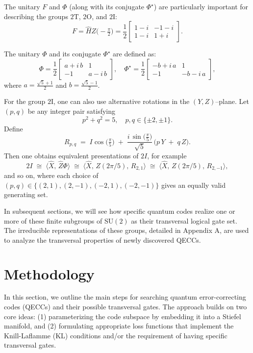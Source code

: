 \documentclass[8pt]{article}
\theoremstyle{definition}
\begin{document}
The unitary \(F\) and \(\Phi\) (along with its conjugate \(\Phi^\star\)) are particularly important for describing the groups \(2\mathrm{T}\), \(2\mathrm{O}\), and \(2\mathrm{I}\):
\[
    F = \hat{H}Z\bigl(-\tfrac{\pi}{2}\bigr) = \frac{1}{2}
    \begin{bmatrix}
        1 - i & -1 - i \\
        1 - i & 1 + i
    \end{bmatrix}.
\]

The unitary \(\Phi\) and its conjugate \(\Phi^\star\) are defined as:
\[
    \Phi = \frac{1}{2}
    \begin{bmatrix}
        a + i\,b & 1        \\
        -1       & a - i\,b
    \end{bmatrix}, \quad
    \Phi^\star = \frac{1}{2}
    \begin{bmatrix}
        -b + i\,a & 1         \\
        -1        & -b - i\,a
    \end{bmatrix},
\]
where \(a = \frac{\sqrt{5} + 1}{2}\) and \(b = \frac{\sqrt{5} - 1}{2}\).

For the group \(2\mathrm{I}\), one can also use alternative rotations in the \((Y,Z)\)–plane.  Let \((p,q)\) be any integer pair satisfying
\[
    p^2 + q^2 = 5,
    \quad
    p,q \in \{\pm2,\pm1\}.
\]
Define
\[
    R_{p,q}
    \;=\;
    I\cos\!\bigl(\tfrac{\pi}{5}\bigr)
    \;+\;
    \frac{i\,\sin\!\bigl(\tfrac{\pi}{5}\bigr)}{\sqrt{5}}\,
    \bigl(p\,Y \;+\; q\,Z\bigr).
\]
Then one obtains equivalent presentations of \(2I\), for example
\[
    2I \;\cong\;
    \bigl\langle \hat X,\,\hat Z\Phi \bigr\rangle
    \;\cong\;
    \bigl\langle \hat X,\,Z(2\pi/5),\,R_{2,1}\bigr\rangle
    \;\cong\;
    \bigl\langle \hat X,\,Z(2\pi/5),\,R_{2,-1}\bigr\rangle,
\]
and so on, where each choice of \((p,q)\in\{(2,1),(2,-1),(-2,1),(-2,-1)\}\) gives an equally valid generating set.



In subsequent sections, we will see how specific quantum codes realize one or more of these finite subgroups of \(\mathrm{SU}(2)\) as their transversal logical gate set. The irreducible representations of these groups, detailed in Appendix A, are used to analyze the transversal properties of newly discovered QECCs.



\section{Methodology}
In this section, we outline the main steps for searching quantum error-correcting codes (QECCs) and their possible transversal gates. The approach builds on two core ideas: (1) parameterizing the code subspace by embedding it into a Stiefel manifold, and (2) formulating appropriate loss functions that implement the Knill-Laflamme (KL) conditions and/or the requirement of having specific transversal gates.
\end{document}
